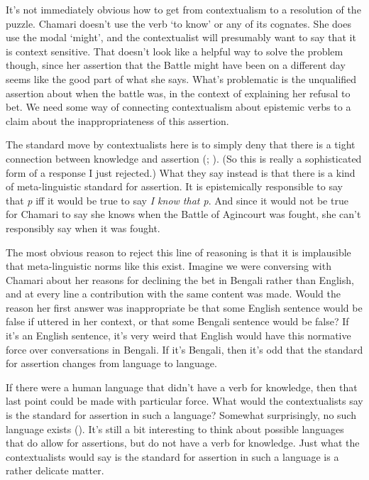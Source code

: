 \documentclass[
  12pt,
  letterpaper,
]{scrbook}
\begin{document}
It's not immediately obvious how to get from contextualism to a
resolution of the puzzle. Chamari doesn't use the verb `to know' or any
of its cognates. She does use the modal `might', and the contextualist
will presumably want to say that it is context sensitive. That doesn't
look like a helpful way to solve the problem though, since her assertion
that the Battle might have been on a different day seems like the good
part of what she says. What's problematic is the unqualified assertion
about when the battle was, in the context of explaining her refusal to
bet. We need some way of connecting contextualism about epistemic verbs
to a claim about the inappropriateness of this assertion.

The standard move by contextualists here is to simply deny that there is
a tight connection between knowledge and assertion
(;
). (So this is really a
sophisticated form of a response I just rejected.) What they say instead
is that there is a kind of meta-linguistic standard for assertion. It is
epistemically responsible to say that \emph{p} iff it would be true to
say \emph{I know that p}. And since it would not be true for Chamari to
say she knows when the Battle of Agincourt was fought, she can't
responsibly say when it was fought.

The most obvious reason to reject this line of reasoning is that it is
implausible that meta-linguistic norms like this exist. Imagine we were
conversing with Chamari about her reasons for declining the bet in
Bengali rather than English, and at every line a contribution with the
same content was made. Would the reason her first answer was
inappropriate be that some English sentence would be false if uttered in
her context, or that some Bengali sentence would be false? If it's an
English sentence, it's very weird that English would have this normative
force over conversations in Bengali. If it's Bengali, then it's odd that
the standard for assertion changes from language to language.

If there were a human language that didn't have a verb for knowledge,
then that last point could be made with particular force. What would the
contextualists say is the standard for assertion in such a language?
Somewhat surprisingly, no such language exists
(). It's still a bit interesting to
think about possible languages that do allow for assertions, but do not
have a verb for knowledge. Just what the contextualists would say is the
standard for assertion in such a language is a rather delicate matter.
\end{document}
